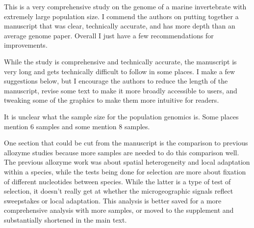 \begin{itquote}
This is a very comprehensive study on the genome of a marine invertebrate
with extremely large population size. I commend the authors on putting
together a manuscript that was clear, technically accurate, and has more
depth than an average genome paper. Overall I just have a few
recommendations for improvements.
\end{itquote}


\begin{point}{} %
While the study is comprehensive and technically accurate, the manuscript
is very long and gets technically difficult to follow in some places. I
make a few suggestions below, but I encourage the authors to reduce the
length of the manuscript, revise some text to make it more broadly
accessible to users, and tweaking some of the graphics to make them more
intuitive for readers.
\end{point}


\begin{point}{} %
It is unclear what the sample size for the population genomics is. Some
places mention 6 samples and some mention 8 samples.
\end{point}


\begin{point}{} %
One section that could be cut from the manuscript is the comparison to
previous allozyme studies because more samples are needed to do this
comparison well. The previous allozyme work was about spatial
heterogeneity and local adaptation within a species, while the tests
being done for selection are more about fixation of different nucleotides
between species. While the latter is a type of test of selection, it
doesn't really get at whether the microgeographic signals reflect
sweepstakes or local adaptation. This analysis is better saved for a more
comprehensive analysis with more samples, or moved to the supplement and
substantially shortened in the main text.
\end{point}


